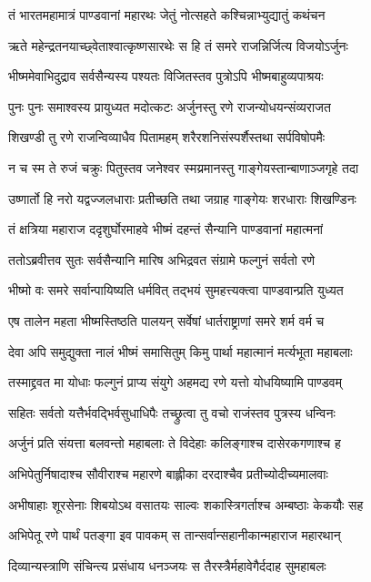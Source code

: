 \twolineshloka
{तं भारतमहामात्रं पाण्डवानां महारथः}
{जेतुं नोत्सहते कश्चिन्नाभ्युद्यातुं कथंचन}


\twolineshloka
{ऋते महेन्द्रतनयाच्छ्वेताश्वात्कृष्णसारथेः}
{स हि तं समरे राजन्निर्जित्य विजयोऽर्जुनः}


\twolineshloka
{भीष्ममेवाभिदुद्राव सर्वसैन्यस्य पश्यतः}
{विजितस्तव पुत्रोऽपि भीष्मबाहुव्यपाश्रयः}


\twolineshloka
{पुनः पुनः समाश्वस्य प्रायुध्यत मदोत्कटः}
{अर्जुनस्तु रणे राजन्योधयन्संव्यराजत}


\twolineshloka
{शिखण्डी तु रणे राजन्विव्याधैव पितामहम्}
{शरैरशनिसंस्पर्शैस्तथा सर्पविषोपमैः}


\twolineshloka
{न च स्म ते रुजं चक्रुः पितुस्तव जनेश्वर}
{स्मय्रमानस्तु गाङ्गेयस्तान्बाणाञ्जगृहे तदा}


\twolineshloka
{उष्णार्तो हि नरो यद्वज्जलधाराः प्रतीच्छति}
{तथा जग्राह गाङ्गेयः शरधाराः शिखण्डिनः}


\twolineshloka
{तं क्षत्रिया महाराज ददृशुर्घोरमाहवे}
{भीष्मं दहन्तं सैन्यानि पाण्डवानां महात्मनां}


\twolineshloka
{ततोऽब्रवीत्तव सुतः सर्वसैन्यानि मारिष}
{अभिद्रवत संग्रामे फल्गुनं सर्वतो रणे}


\twolineshloka
{भीष्मो वः समरे सर्वान्पायिष्यति धर्मवित्}
{तद्भयं सुमहत्त्यक्त्वा पाण्डवान्प्रति युध्यत}


\twolineshloka
{एष तालेन महता भीष्मस्तिष्ठति पालयन्}
{सर्वेषां धार्तराष्ट्राणां समरे शर्म वर्म च}


\twolineshloka
{देवा अपि समुद्युक्ता नालं भीष्मं समासितुम्}
{किमु पार्था महात्मानं मर्त्यभूता महाबलाः}


\twolineshloka
{तस्माद्द्रवत मा योधाः फल्गुनं प्राप्य संयुगे}
{अहमद्य रणे यत्तो योधयिष्यामि पाण्डवम्}


\twolineshloka
{सहितः सर्वतो यत्तैर्भवद्भिर्वसुधाधिपैः}
{तच्छ्रुत्वा तु वचो राजंस्तव पुत्रस्य धन्विनः}


\twolineshloka
{अर्जुनं प्रति संयत्ता बलवन्तो महाबलाः}
{ते विदेहाः कलिङ्गाश्च दासेरकगणाश्च ह}


\twolineshloka
{अभिपेतुर्निषादाश्च सौवीराश्च महारणे}
{बाह्लीका दरदाश्चैव प्रतीच्योदीच्यमालवाः}


\twolineshloka
{अभीषाहाः शूरसेनाः शिबयोऽथ वसातयः}
{साल्वः शकास्त्रिगर्ताश्च अम्बष्ठाः केकयौः सह}


\twolineshloka
{अभिपेतू रणे पार्थं पतङ्गा इव पावकम्}
{स तान्सर्वान्सहानीकान्महाराज महारथान्}


\twolineshloka
{दिव्यान्यस्त्राणि संचिन्त्य प्रसंधाय धनञ्जयः}
{स तैरस्त्रैर्महावेगैर्ददाह सुमहाबलः}


